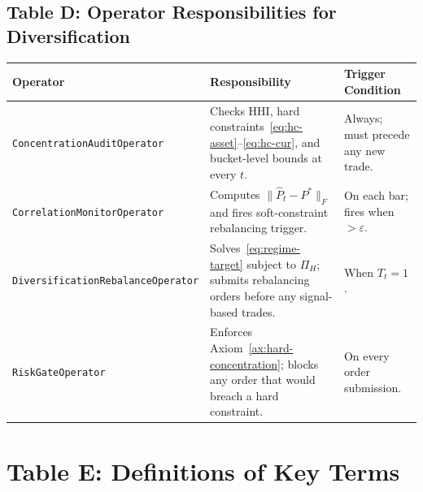 \documentclass[12pt,openany]{book}
\numberwithin{equation}{chapter}
\theoremstyle{plain}
\theoremstyle{definition}
\theoremstyle{remark}
\begin{document}
\section*{Table D: Operator Responsibilities for Diversification}

\begin{center}
{\small
\begin{tabularx}{\textwidth}{@{} p{8.2cm} X X @{}}
\hline
\textbf{Operator} & \textbf{Responsibility} & \textbf{Trigger Condition} \\
\hline
\texttt{ConcentrationAuditOperator} &
  Checks HHI, hard constraints~\eqref{eq:hc-asset}--\eqref{eq:hc-cur},
  and bucket-level bounds at every $t$. &
  Always; must precede any new trade. \\
\addlinespace
\texttt{CorrelationMonitorOperator} &
  Computes $\|\hat{P}_t - P^*\|_F$ and fires soft-constraint
  rebalancing trigger. &
  On each bar; fires when $> \varepsilon$. \\
\addlinespace
\texttt{DiversificationRebalanceOperator} &
  Solves~\eqref{eq:regime-target} subject to $\Pi_H$; submits
  rebalancing orders before any signal-based trades. &
  When $T_t = 1$. \\
\addlinespace
\texttt{RiskGateOperator} &
  Enforces Axiom~\ref{ax:hard-concentration}; blocks any order
  that would breach a hard constraint. &
  On every order submission. \\
\hline
\end{tabularx}
}
\end{center}


\chapter*{Table E: Definitions of Key Terms}
\end{document}
